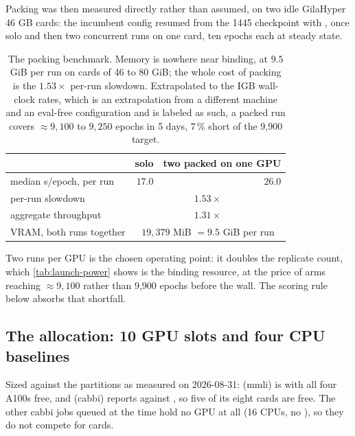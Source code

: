 Packing was then measured directly rather than assumed, on two idle GilaHyper 46 GB cards:
the incumbent config resumed from the 1445 checkpoint with , once
solo and then two concurrent runs on one card, ten epochs each at steady state.

\begin{table}[htbp]
\centering\small
\begin{tabular}{lrr}
\toprule
 & solo & two packed on one GPU \\
\midrule
median s/epoch, per run & $17.0$ & $26.0$ \\
per-run slowdown & \multicolumn{2}{c}{$1.53\times$} \\
aggregate throughput & \multicolumn{2}{c}{$1.31\times$} \\
VRAM, both runs together & \multicolumn{2}{c}{$19{,}379$ MiB $= 9.5$ GiB per run} \\
\bottomrule
\end{tabular}
\caption[]{The packing benchmark. Memory is nowhere near binding, at $9.5$ GiB per run on
cards of 46 to 80 GiB; the whole cost of packing is the $1.53\times$ per-run slowdown.
Extrapolated to the IGB wall-clock rates, which is an extrapolation from a different
machine and an eval-free configuration and is labeled as such, a packed run covers
$\approx 9{,}100$ to $9{,}250$ epochs in 5 days, $7\,\%$ short of the 9,900 target.}
\label{tab:launch-packing}
\end{table}

Two runs per GPU is the chosen operating point: it doubles the replicate count, which
\cref{tab:launch-power} shows is the binding resource, at the price of arms reaching
$\approx 9{,}100$ rather than 9,900 epochs before the wall. The scoring rule below absorbs
that shortfall.

\subsection{The allocation: 10 GPU slots and four CPU baselines}

Sized against the partitions as measured on 2026-08-31:  (mmli) is
 with all four A100s free, and  (cabbi) reports
 against , so five of its eight cards
are free. The other cabbi jobs queued at the time hold no GPU at all (16 CPUs, no
), so they do not compete for cards.

